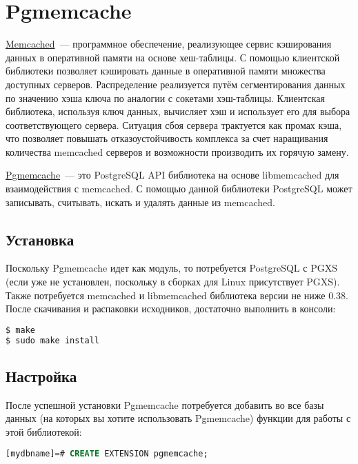 \section{Pgmemcache}
\label{sec:pgmemcache}

\href{http://memcached.org/}{Memcached}~--- программное обеспечение, реализующее сервис кэширования данных в оперативной памяти на основе хеш-таблицы. С помощью клиентской библиотеки позволяет кэшировать данные в оперативной памяти множества доступных серверов. Распределение реализуется путём сегментирования данных по значению хэша ключа по аналогии с сокетами хэш-таблицы. Клиентская библиотека, используя ключ данных, вычисляет хэш и использует его для выбора соответствующего сервера. Ситуация сбоя сервера трактуется как промах кэша, что позволяет повышать отказоустойчивость комплекса за счет наращивания количества memcached серверов и возможности производить их горячую замену.

\href{http://pgfoundry.org/projects/pgmemcache/}{Pgmemcache}~--- это PostgreSQL API библиотека на основе libmemcached для взаимодействия с memcached. С помощью данной библиотеки PostgreSQL может записывать, считывать, искать и удалять данные из memcached.


\subsection{Установка}

Поскольку Pgmemcache идет как модуль, то потребуется PostgreSQL с PGXS (если уже не установлен, поскольку в сборках для Linux присутствует PGXS). Также потребуется memcached и libmemcached библиотека версии не ниже 0.38. После скачивания и распаковки исходников, достаточно выполнить в консоли:

\begin{lstlisting}[language=Bash,label=lst:pgcache1,caption=Установка из исходников]
$ make
$ sudo make install
\end{lstlisting}


\subsection{Настройка}

После успешной установки Pgmemcache потребуется добавить во все базы данных (на которых вы хотите использовать Pgmemcache) функции для работы с этой библиотекой:

\begin{lstlisting}[language=SQL,label=lst:pgcache5,caption=Настройка]
% psql [mydbname] [pguser]
[mydbname]=# CREATE EXTENSION pgmemcache;
\end{lstlisting}

